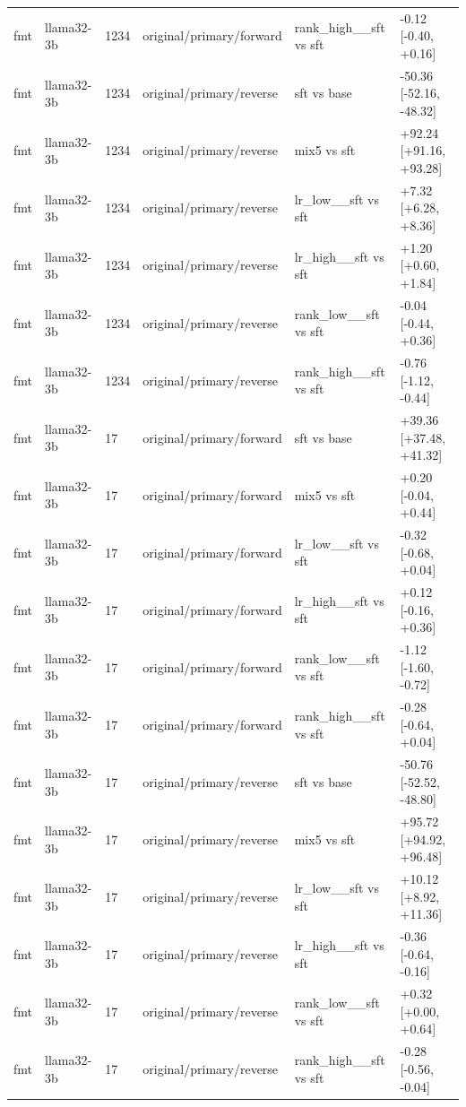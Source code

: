 \begin{table}[t]
\begin{tabular}{llllll}
fmt & llama32-3b & 1234 & original/primary/forward & rank\_high\_\_sft vs sft & -0.12 [-0.40, +0.16] \\
fmt & llama32-3b & 1234 & original/primary/reverse & sft vs base & -50.36 [-52.16, -48.32] \\
fmt & llama32-3b & 1234 & original/primary/reverse & mix5 vs sft & +92.24 [+91.16, +93.28] \\
fmt & llama32-3b & 1234 & original/primary/reverse & lr\_low\_\_sft vs sft & +7.32 [+6.28, +8.36] \\
fmt & llama32-3b & 1234 & original/primary/reverse & lr\_high\_\_sft vs sft & +1.20 [+0.60, +1.84] \\
fmt & llama32-3b & 1234 & original/primary/reverse & rank\_low\_\_sft vs sft & -0.04 [-0.44, +0.36] \\
fmt & llama32-3b & 1234 & original/primary/reverse & rank\_high\_\_sft vs sft & -0.76 [-1.12, -0.44] \\
fmt & llama32-3b & 17 & original/primary/forward & sft vs base & +39.36 [+37.48, +41.32] \\
fmt & llama32-3b & 17 & original/primary/forward & mix5 vs sft & +0.20 [-0.04, +0.44] \\
fmt & llama32-3b & 17 & original/primary/forward & lr\_low\_\_sft vs sft & -0.32 [-0.68, +0.04] \\
fmt & llama32-3b & 17 & original/primary/forward & lr\_high\_\_sft vs sft & +0.12 [-0.16, +0.36] \\
fmt & llama32-3b & 17 & original/primary/forward & rank\_low\_\_sft vs sft & -1.12 [-1.60, -0.72] \\
fmt & llama32-3b & 17 & original/primary/forward & rank\_high\_\_sft vs sft & -0.28 [-0.64, +0.04] \\
fmt & llama32-3b & 17 & original/primary/reverse & sft vs base & -50.76 [-52.52, -48.80] \\
fmt & llama32-3b & 17 & original/primary/reverse & mix5 vs sft & +95.72 [+94.92, +96.48] \\
fmt & llama32-3b & 17 & original/primary/reverse & lr\_low\_\_sft vs sft & +10.12 [+8.92, +11.36] \\
fmt & llama32-3b & 17 & original/primary/reverse & lr\_high\_\_sft vs sft & -0.36 [-0.64, -0.16] \\
fmt & llama32-3b & 17 & original/primary/reverse & rank\_low\_\_sft vs sft & +0.32 [+0.00, +0.64] \\
fmt & llama32-3b & 17 & original/primary/reverse & rank\_high\_\_sft vs sft & -0.28 [-0.56, -0.04] \\

\end{tabular}
\end{table}
